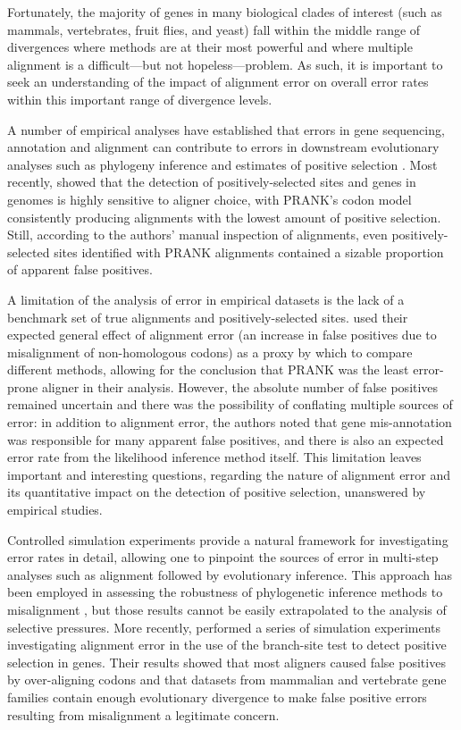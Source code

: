 Fortunately, the majority of genes in many biological clades of
interest (such as mammals, vertebrates, fruit flies, and yeast) fall
within the middle range of divergences where \sw methods are at their
most powerful and where multiple alignment is a difficult---but not
hopeless---problem. As such, it is important to seek an understanding
of the impact of alignment error on overall error rates within this
important range of divergence levels.

A number of empirical analyses have established that errors in gene
sequencing, annotation and alignment can contribute to errors in
downstream evolutionary analyses such as phylogeny inference
\citep{Wong2008Alignment} and estimates of positive selection
\citep{Schneider2009,MarkovaRaina2011}. Most recently,
\citet{MarkovaRaina2011} showed
that the detection of positively-selected sites and genes in \Dr
genomes is highly sensitive to aligner choice, with PRANK's codon
model \citep{Loytynoja2008PhylogenyAware} consistently producing
alignments with the lowest amount of positive selection. Still,
according to the authors' manual inspection of alignments, even
positively-selected sites identified with PRANK alignments contained a
sizable proportion of apparent false positives.

A limitation of the analysis of error in empirical datasets is the
lack of a benchmark set of true alignments and positively-selected
sites. \citet{MarkovaRaina2011} used their expected general effect of
alignment error (an increase in false positives due to misalignment of
non-homologous codons) as a proxy by which to compare different
methods, allowing for the conclusion that PRANK was the least
error-prone aligner in their analysis. However, the absolute number of
false positives remained uncertain and there was the possibility of
conflating multiple sources of error: in addition to alignment error,
the authors noted that gene mis-annotation was responsible for many
apparent false positives, and there is also an expected error rate
from the likelihood inference method itself. This limitation leaves
important and interesting questions, regarding the nature of alignment
error and its quantitative impact on the detection of positive
selection, unanswered by empirical studies.

Controlled simulation experiments provide a natural framework for
investigating error rates in detail, allowing one to pinpoint the
sources of error in multi-step analyses such as alignment followed by
evolutionary inference. This approach has been employed in assessing
the robustness of phylogenetic inference methods to misalignment
\citep{Dwivedi2009Phylogenetic,Ogden2006Multiple,Loytynoja2008PhylogenyAware},
but those results cannot be easily extrapolated to the analysis of \sw
selective pressures. More recently, \citet{Fletcher2010} performed a
series of simulation experiments investigating alignment error in the
use of the branch-site test to detect positive selection in
genes. Their results showed that most aligners caused false positives
by over-aligning codons and that datasets from mammalian and
vertebrate gene families contain enough evolutionary divergence to
make false positive errors resulting from misalignment a legitimate
concern.

